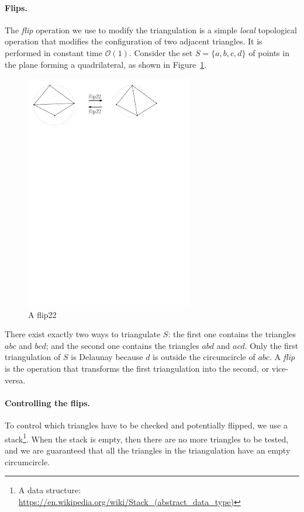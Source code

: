 \paragraph{Flips.}The \emph{flip} operation we use to modify the triangulation is a simple \emph{local} topological operation that modifies the configuration of two adjacent triangles. 
It is performed in constant time $\mathcal{O}(1)$.
Consider the set $S = \{a, b, c, d\}$ of points in the plane forming a quadrilateral, as shown in Figure~\ref{p:flip22}. 
\begin{figure}
  \centering
  \includegraphics[width=0.65\textwidth]{figs/flip22}
  \caption{A flip22}
\label{p:flip22}
\end{figure}
There exist exactly two ways to triangulate $S$: the first one contains the triangles $abc$ and $bcd$; and the second one contains the triangles $abd$ and $acd$. 
Only the first triangulation of $S$ is Delaunay because $d$ is outside the circumcircle of $abc$. 
A \emph{flip} is the operation that transforms the first triangulation into the second, or vice-versa.


\paragraph{Controlling the flips.}
To control which triangles have to be checked and potentially flipped, we use a stack\footnote{A data structure: \url{https://en.wikipedia.org/wiki/Stack_(abstract_data_type)}}. 
When the stack is empty, then there are no more triangles to be tested, and we are guaranteed that all the triangles in the triangulation have an empty circumcircle.



